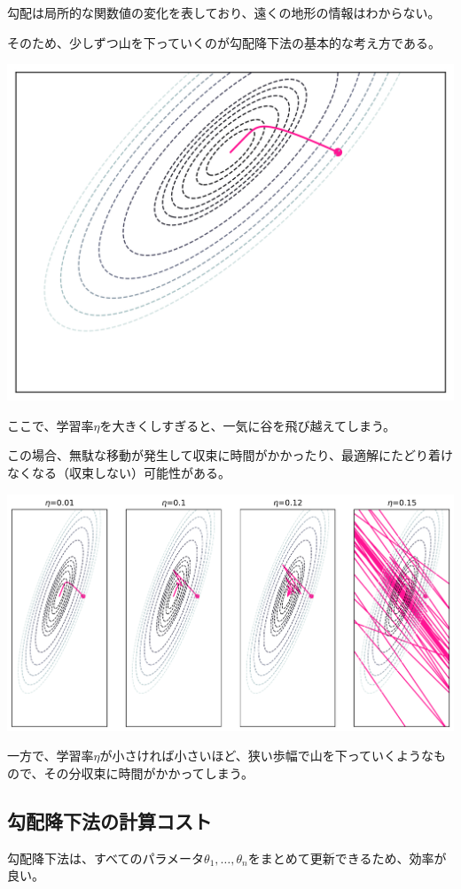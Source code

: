 \documentclass[../../../topic_machine-learning]{subfiles}
\begin{document}
勾配は局所的な関数値の変化を表しており、遠くの地形の情報はわからない。

そのため、少しずつ山を下っていくのが勾配降下法の基本的な考え方である。

\br

\includegraphics[width=0.75\linewidth]{./python/gradient-descent.png}

ここで、学習率$\eta$を大きくしすぎると、一気に谷を飛び越えてしまう。

この場合、無駄な移動が発生して収束に時間がかかったり、最適解にたどり着けなくなる（収束しない）可能性がある。

\br

\includegraphics[width=0.95\linewidth]{./python/gradient-descent_compare-alpha.png}

一方で、学習率$\eta$が小さければ小さいほど、狭い歩幅で山を下っていくようなもので、その分収束に時間がかかってしまう。

\subsection{勾配降下法の計算コスト}

勾配降下法は、すべてのパラメータ$\theta_1, \ldots, \theta_n$をまとめて更新できるため、効率が良い。
\end{document}
